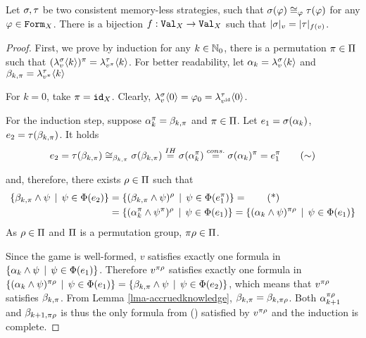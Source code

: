 \begin{theorem}
Let $\sigma, \tau$ be two consistent memory-less strategies, such that
$\sigma(\varphi) \cong_{\varphi} \tau(\varphi)$ for any $\varphi\in\mathtt{Form}_X$.
There is a bijection $f:\mathtt{Val}_X -> \mathtt{Val}_X$ such that
$|\sigma|_{v} = |\tau|_{f(v)}$.
\end{theorem}

\begin{proof}
First, we prove by induction for any $k\in\mathbb{N}_0$,
  there is a permutation $\pi\in \Pi$ such that
  $(\lambda^{\sigma}_{v}\langle k\rangle)^\pi = \lambda^{\tau}_{v^\pi}\langle k\rangle$.
For better readability, let
  $\alpha_k = \lambda^{\sigma}_{v}\langle k\rangle$ and
  $\beta_{k, \pi} = \lambda^{\tau}_{v^\pi}\langle k\rangle$

For $k=0$, take $\pi = \mathtt{id}_X$.
Clearly, $\lambda^{\sigma}_{v}\langle0\rangle = \varphi_0 = \lambda^{\tau}_{v^{\mathtt{id}}}\langle0\rangle$.

For the induction step, suppose $\alpha_k^\pi = \beta_{k, \pi}$ and $\pi\in \Pi$.
Let $e_1 = \sigma(\alpha_k)$, $e_2 = \tau(\beta_{k, \pi})$. It holds
\begin{equation}
e_2 = \tau(\beta_{k, \pi})
    \cong_{\beta_{k, \pi}}  \sigma(\beta_{k, \pi})
    \stackrel{IH}{=} \sigma(\alpha_k^\pi)
    \stackrel{cons.}{=} \sigma(\alpha_k)^\pi
    = e_1^\pi \label{eq:expsym}\tag{$\sim$}
\end{equation}

and, therefore, there exists $\rho\in\Pi$ such that
\begin{align}
 \{ \knowx_{k, \perm} \wedge \formx \| \formx\in\outcome(\exp_2) \} &= %
 \{ (\knowx_{k, \perm} \wedge \formx)^\permx \| \formx\in\outcome(\exp_1^\perm) \} = \label{eq:sets}\tag{*}\\
&= \{ (\know_k^\perm \wedge \formx^\perm)^\permx \| \formx\in\outcome(\exp_1) \} =
 \{ (\know_k \wedge \formx)^{\perm\permx} \| \formx\in\outcome(\exp_1) \}
\end{align}
As $\rho\in\Pi$ and $\Pi$ is a permutation group, $\pi\rho\in\Pi$.

Since the game is well-formed,
  $v$ satisfies exactly one formula in
  $\{ \alpha_k \wedge \psi \:\:|\:\: \psi\in\Phi(e_1) \}$.
Therefore $v^{\pi\rho}$ satisfies exactly one formula
  in
  $\{ (\alpha_k \wedge \psi)^{\pi\rho} \:\:|\:\: \psi\in\Phi(e_1) \}  =
   \{ \beta_{k, \pi} \wedge \psi \:\:|\:\: \psi\in\Phi(e_2) \}$,
  which means that $v^{\pi\rho}$ satisfies $\beta_{k, \pi}$.
From Lemma \ref{lma-accruedknowledge}, $\beta_{k, \pi} = \beta_{k, \pi\rho}$.
Both $\alpha_{k+1}^{\pi\rho}$ and $\beta_{k+1, \pi\rho}$ is thus the only
  formula from () satisfied by $v^{\pi\rho}$ and
  the induction is complete.


\end{proof}
